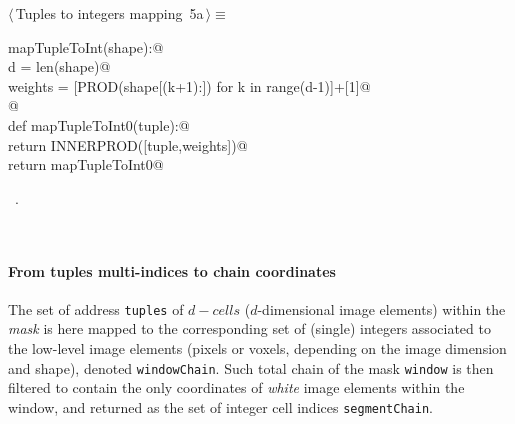 \documentclass[11pt,oneside]{article}	%
\begin{document}
\begin{flushleft} \small
\begin{minipage}{\linewidth} \label{scrap6}
\protect{}$\langle\,$Tuples to integers mapping\nobreak\ {\footnotesize 5a}$\,\rangle\equiv$
\vspace{-1ex}
\begin{list}{}{} \item
\mbox{}\verb@def mapTupleToInt(shape):@\\
\mbox{}\verb@   d = len(shape)@\\
\mbox{}\verb@   weights = [PROD(shape[(k+1):]) for k in range(d-1)]+[1]@\\
\mbox{}\verb@   @\\
\mbox{}\verb@   def mapTupleToInt0(tuple):@\\
\mbox{}\verb@      return INNERPROD([tuple,weights])@\\
\mbox{}\verb@   return mapTupleToInt0@\\
\mbox{}\verb@@{\NWsep}
\end{list}
\vspace{-1ex}
\footnotesize\addtolength{\baselineskip}{-1ex}
\begin{list}{}{\setlength{\itemsep}{-\parsep}\setlength{\itemindent}{-\leftmargin}}
\item \NWtxtMacroRefIn\ .
\end{list}
\end{minipage}\\[4ex]
\end{flushleft}


\paragraph{From tuples multi-indices to chain coordinates}

The set of address \texttt{tuples} of $d-cells$ ($d$-dimensional image elements) within the \emph{mask} is here mapped to the corresponding set of (single) integers associated to the low-level image elements (pixels or voxels, depending on the image dimension and shape), denoted \texttt{windowChain}. Such total chain of the mask \texttt{window} is then filtered to contain the only coordinates of \emph{white} image elements within the window, and returned as the set of integer cell indices \texttt{segmentChain}.
\end{document}
